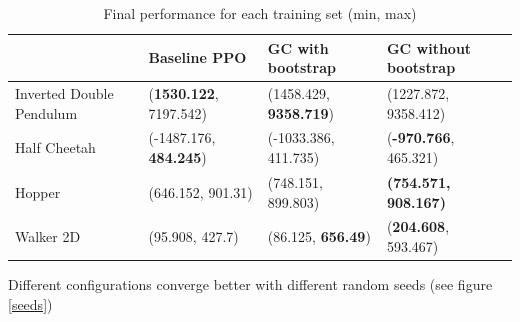 \begin{table}
  \begin{center}
\begin{tabular}{p{}|p{}p{}p{}}
    \hline
    & Baseline PPO & GC with bootstrap & GC without bootstrap \\
    \hline
    Inverted Double Pendulum & (\textbf{1530.122}, 7197.542) & (1458.429, \textbf{9358.719}) & (1227.872, 9358.412) \\
    \hline
    Half Cheetah & (-1487.176, \textbf{484.245}) & (-1033.386, 411.735) & (\textbf{-970.766}, 465.321)\\
    \hline
    Hopper & (646.152, 901.31) & (748.151, 899.803) & \textbf{(754.571, 908.167)} \\
    \hline
    Walker 2D & (95.908, 427.7) & (86.125, \textbf{656.49}) & (\textbf{204.608}, 593.467) \\
    \hline  
\end{tabular}
  \end{center}
  \caption{Final performance for each training set (min, max)}
  \label{hyperparameters}
\end{table}

Different configurations converge better with different random seeds (see figure \ref{seeds})



